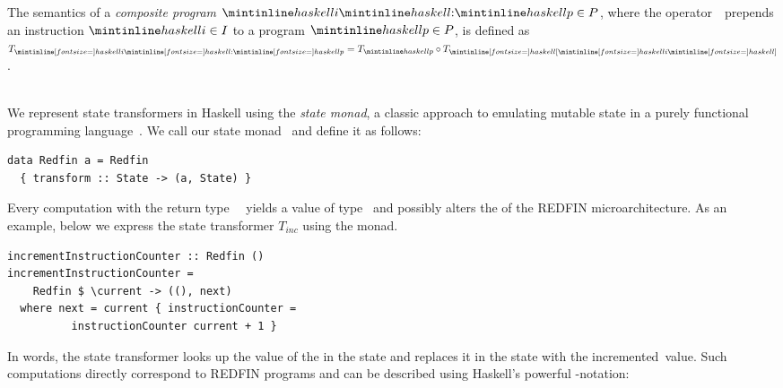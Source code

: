     The semantics of a \emph{composite program} $\hs{i}\hs{:}\hs{p} \in P$,
    where the operator~\hs{:}~prepends an instruction $\hs{i} \in I$ to a program
    $\hs{p} \in P$, is defined as $T_{\subhs{i}\subhs{:}\subhs{p}} = T_{\hs{p}} \circ T_{\subhs{[}\subhs{i}\subhs{]}}$.


\noindent\hrulefill~\\

We represent state transformers in Haskell using the \emph{state monad}, a
classic approach to emulating mutable state in a purely functional programming
language~\cite{wadler1990comprehending}. We call our state monad~ and
define it as follows:

\begin{verbatim}
data Redfin a = Redfin
  { transform :: State -> (a, State) }
\end{verbatim}

\noindent
Every computation with the return type~~ yields a value of type~
and possibly alters the  of the REDFIN microarchitecture. As an example,
below we express the state transformer $T_\textit{inc}$ using the  monad.

\begin{verbatim}
incrementInstructionCounter :: Redfin ()
incrementInstructionCounter =
    Redfin $ \current -> ((), next)
  where next = current { instructionCounter =
          instructionCounter current + 1 }
\end{verbatim}

\noindent
In words, the state transformer looks up the value of the 
in the  state and replaces it in the  state with the
incremented~value. Such computations directly correspond to REDFIN programs and
can be described using Haskell's powerful -notation:




